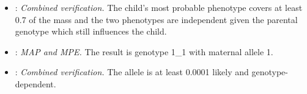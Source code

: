 \begingroup\raggedright
\begin{itemize}[nosep,leftmargin=*]
\item {}: \emph{Combined verification.}  The child's most probable phenotype covers at least 0.7 of the mass and the two phenotypes are independent given the parental genotype which still influences the child.
\item {}: \emph{MAP and MPE.}  The result is genotype 1\_1 with maternal allele 1.
\item {}: \emph{Combined verification.}  The allele is at least 0.0001 likely and genotype-dependent.
\end{itemize}
\endgroup
